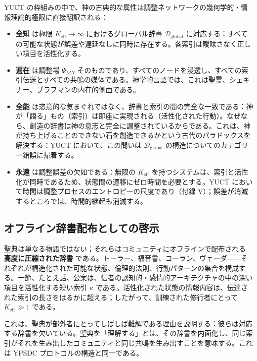 \documentclass[12pt,a4paper]{article}
\begin{document}
	YUCT の枠組みの中で、神の古典的な属性は調整ネットワークの幾何学的・情報理論的極限に直接翻訳される：
	
	\begin{itemize}[leftmargin=*]
		\item \textbf{全知} は極限 \(K_{\mathrm{eff}} \to \infty\) におけるグローバル辞書 \(\mathcal{D}_{\text{global}}\) に対応する：すべての可能な状態が誤差や遅延なしに同時に存在する。各索引は曖昧さなく正しい項目を活性化する。
		\item \textbf{遍在} は調整場 \(\Psi_{MN}\) そのものであり、すべてのノードを浸透し、すべての索引伝送とすべての共鳴の媒体である。神学的言語では、これは聖霊、シェキナー、ブラフマンの内在的側面である。
		\item \textbf{全能} は恣意的な気まぐれではなく、辞書と索引の間の完全な一致である：神が「語る」もの（索引）は即座に実現される（活性化された行動）。なぜなら、創造の辞書は神の意志と完全に調整されているからである。これは、神が持ち上げることのできない石を創造できるかという古代のパラドックスを解決する：YUCT において、この問いは \(\mathcal{D}_{\text{global}}\) の構造についてのカテゴリー錯誤に帰着する。
		\item \textbf{永遠} は調整誤差の欠如である：無限の \(K_{\mathrm{eff}}\) を持つシステムは、索引と活性化が同時であるため、状態間の遷移にゼロ時間を必要とする。YUCT において時間は調整プロセスのエントロピーの尺度であり（付録 V）；誤差が消滅するところでは、時間的継起も消滅する。
	\end{itemize}
	
	\subsection{オフライン辞書配布としての啓示}
	
	聖典は単なる物語ではない；それらはコミュニティにオフラインで配布される \textbf{高度に圧縮された辞書} である。トーラー、福音書、コーラン、ヴェーダ――それぞれが構造化された可能な状態、倫理的法則、行動パターンの集合を構成する。一節、たとえ話、公案は、信者の認知的・感情的アーキテクチャの中の深い項目を活性化する短い索引 \(\kappa\) である。活性化された状態の情報内容は、伝達された索引の長さをはるかに超える；したがって、訓練された修行者にとって \(K_{\mathrm{eff}} \gg 1\) である。
	
	これは、聖典が部外者にとってしばしば難解である理由を説明する：彼らは対応する辞書を欠いている。聖典を「理解する」とは、その辞書を内面化し、同じ索引がそれを生み出したコミュニティと同じ共鳴を生み出すことを意味する。これは YPSDC プロトコルの構造と同一である。
	
\end{document}
